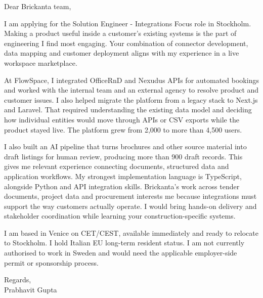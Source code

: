\documentclass[a4paper,11pt]{article}
\begin{document}
Dear Brickanta team,

I am applying for the Solution Engineer - Integrations Focus role in Stockholm. Making a product useful inside a customer's existing systems is the part of engineering I find most engaging. Your combination of connector development, data mapping and customer deployment aligns with my experience in a live workspace marketplace.

At FlowSpace, I integrated OfficeRnD and Nexudus APIs for automated bookings and worked with the internal team and an external agency to resolve product and customer issues. I also helped migrate the platform from a legacy stack to Next.js and Laravel. That required understanding the existing data model and deciding how individual entities would move through APIs or CSV exports while the product stayed live. The platform grew from 2,000 to more than 4,500 users.

I also built an AI pipeline that turns brochures and other source material into draft listings for human review, producing more than 900 draft records. This gives me relevant experience connecting documents, structured data and application workflows. My strongest implementation language is TypeScript, alongside Python and API integration skills. Brickanta's work across tender documents, project data and procurement interests me because integrations must support the way customers actually operate. I would bring hands-on delivery and stakeholder coordination while learning your construction-specific systems.

I am based in Venice on CET/CEST, available immediately and ready to relocate to Stockholm. I hold Italian EU long-term resident status. I am not currently authorised to work in Sweden and would need the applicable employer-side permit or sponsorship process.

Regards,\\
Prabhavit Gupta
\end{document}
